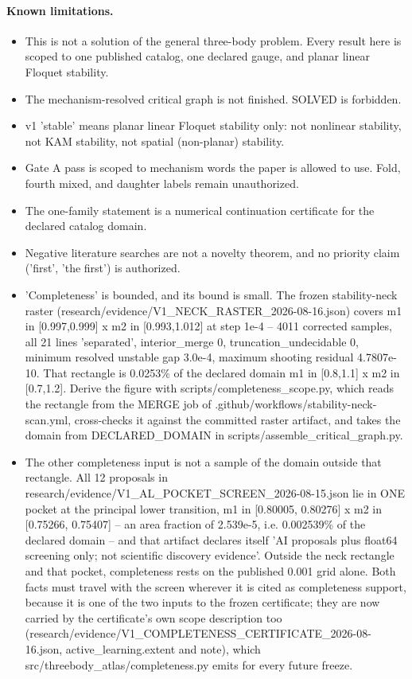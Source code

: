\paragraph{Known limitations.}
\begin{itemize}
\item This is not a solution of the general three-body problem. Every result here is scoped to one published catalog, one declared gauge, and planar linear Floquet stability.
\item The mechanism-resolved critical graph is not finished. SOLVED is forbidden.
\item v1 'stable' means planar linear Floquet stability only: not nonlinear stability, not KAM stability, not spatial (non-planar) stability.
\item Gate A pass is scoped to mechanism words the paper is allowed to use. Fold, fourth mixed, and daughter labels remain unauthorized.
\item The one-family statement is a numerical continuation certificate for the declared catalog domain.
\item Negative literature searches are not a novelty theorem, and no priority claim ('first', 'the first') is authorized.
\item 'Completeness' is bounded, and its bound is small. The frozen stability-neck raster (research/evidence/V1\_NECK\_RASTER\_2026-08-16.json) covers m1 in [0.997,0.999] x m2 in [0.993,1.012] at step 1e-4 -- 4011 corrected samples, all 21 lines 'separated', interior\_merge 0, truncation\_undecidable 0, minimum resolved unstable gap 3.0e-4, maximum shooting residual 4.7807e-10. That rectangle is 0.0253\% of the declared domain m1 in [0.8,1.1] x m2 in [0.7,1.2]. Derive the figure with scripts/completeness\_scope.py, which reads the rectangle from the MERGE job of .github/workflows/stability-neck-scan.yml, cross-checks it against the committed raster artifact, and takes the domain from DECLARED\_DOMAIN in scripts/assemble\_critical\_graph.py.
\item The other completeness input is not a sample of the domain outside that rectangle. All 12 proposals in research/evidence/V1\_AL\_POCKET\_SCREEN\_2026-08-15.json lie in ONE pocket at the principal lower transition, m1 in [0.80005, 0.80276] x m2 in [0.75266, 0.75407] -- an area fraction of 2.539e-5, i.e. 0.002539\% of the declared domain -- and that artifact declares itself 'AI proposals plus float64 screening only; not scientific discovery evidence'. Outside the neck rectangle and that pocket, completeness rests on the published 0.001 grid alone. Both facts must travel with the screen wherever it is cited as completeness support, because it is one of the two inputs to the frozen certificate; they are now carried by the certificate's own scope description too (research/evidence/V1\_COMPLETENESS\_CERTIFICATE\_2026-08-16.json, active\_learning.extent and note), which src/threebody\_atlas/completeness.py emits for every future freeze.

\end{itemize}
